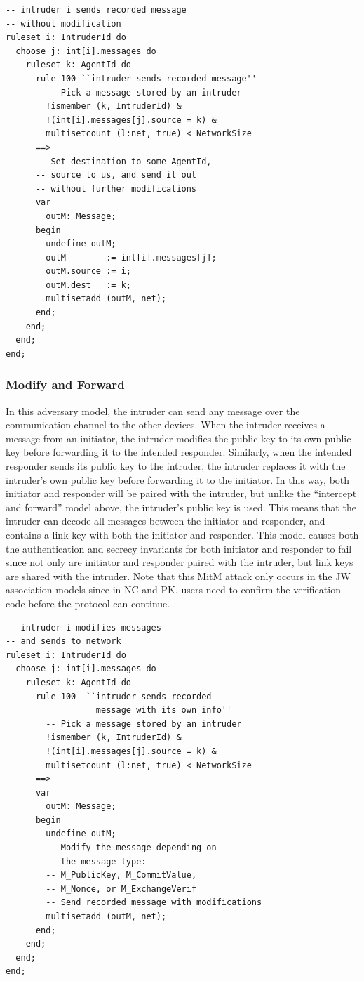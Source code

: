 \documentclass{acm_proc_article-sp}
\begin{document}
\begin{verbatim}
-- intruder i sends recorded message
-- without modification
ruleset i: IntruderId do
  choose j: int[i].messages do
    ruleset k: AgentId do
      rule 100 ``intruder sends recorded message''
        -- Pick a message stored by an intruder
        !ismember (k, IntruderId) &
        !(int[i].messages[j].source = k) &
        multisetcount (l:net, true) < NetworkSize
      ==>
      -- Set destination to some AgentId,
      -- source to us, and send it out
      -- without further modifications
      var
        outM: Message;
      begin
        undefine outM;
        outM        := int[i].messages[j];
        outM.source := i;
        outM.dest   := k;
        multisetadd (outM, net);
      end;
    end;
  end;
end;
\end{verbatim}

\subsubsection{Modify and Forward}
In this adversary model, the intruder can send any message over the communication channel to the other devices. When the intruder receives a message from an initiator, the intruder modifies the public key to its own public key before forwarding it to the intended responder. Similarly, when the intended responder sends its public key to the intruder, the intruder replaces it with the intruder's own public key before forwarding it to the initiator. In this way, both initiator and responder will be paired with the intruder, but unlike the ``intercept and forward'' model above, the intruder's public key is used. This means that the intruder can decode all messages between the initiator and responder, and contains a link key with both the initiator and responder. This model causes both the authentication and secrecy invariants for both initiator and responder to fail since not only are initiator and responder paired with the intruder, but link keys are shared with the intruder. Note that this MitM attack only occurs in the JW association models since in NC and PK, users need to confirm the verification code before the protocol can continue.

\begin{verbatim}
-- intruder i modifies messages
-- and sends to network
ruleset i: IntruderId do
  choose j: int[i].messages do
    ruleset k: AgentId do
      rule 100  ``intruder sends recorded
                  message with its own info''
        -- Pick a message stored by an intruder
        !ismember (k, IntruderId) &
        !(int[i].messages[j].source = k) &
        multisetcount (l:net, true) < NetworkSize
      ==>
      var
        outM: Message;
      begin
        undefine outM;
        -- Modify the message depending on 
        -- the message type:
        -- M_PublicKey, M_CommitValue,
        -- M_Nonce, or M_ExchangeVerif
        -- Send recorded message with modifications
        multisetadd (outM, net);
      end;
    end;
  end;
end;
\end{verbatim}
\end{document}
